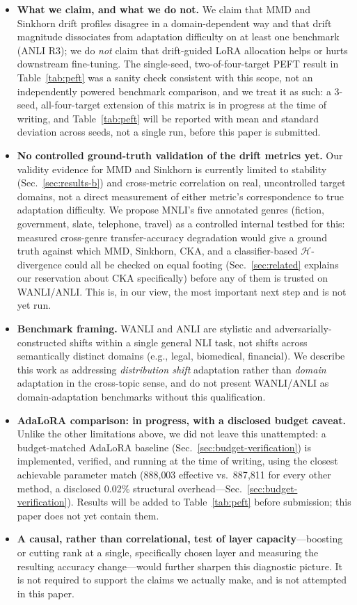 \documentclass[conference]{IEEEtran}
\begin{document}
\begin{itemize}
\item \textbf{What we claim, and what we do not.} We claim that MMD and Sinkhorn drift profiles disagree in a domain-dependent way and that drift magnitude dissociates from adaptation difficulty on at least one benchmark (ANLI R3); we do \emph{not} claim that drift-guided LoRA allocation helps or hurts downstream fine-tuning. The single-seed, two-of-four-target PEFT result in Table~\ref{tab:peft} was a sanity check consistent with this scope, not an independently powered benchmark comparison, and we treat it as such: a 3-seed, all-four-target extension of this matrix is in progress at the time of writing, and Table~\ref{tab:peft} will be reported with mean and standard deviation across seeds, not a single run, before this paper is submitted.
\item \textbf{No controlled ground-truth validation of the drift metrics yet.} Our validity evidence for MMD and Sinkhorn is currently limited to stability (Sec.~\ref{sec:results-b}) and cross-metric correlation on real, uncontrolled target domains, not a direct measurement of either metric's correspondence to true adaptation difficulty. We propose MNLI's five annotated genres (fiction, government, slate, telephone, travel) as a controlled internal testbed for this: measured cross-genre transfer-accuracy degradation would give a ground truth against which MMD, Sinkhorn, CKA, and a classifier-based $\mathcal{H}$-divergence \cite{bendavid2010theory} could all be checked on equal footing (Sec.~\ref{sec:related} explains our reservation about CKA specifically) before any of them is trusted on WANLI/ANLI. This is, in our view, the most important next step and is not yet run.
\item \textbf{Benchmark framing.} WANLI and ANLI are stylistic and adversarially-constructed shifts within a single general NLI task, not shifts across semantically distinct domains (e.g., legal, biomedical, financial). We describe this work as addressing \emph{distribution shift} adaptation rather than \emph{domain} adaptation in the cross-topic sense, and do not present WANLI/ANLI as domain-adaptation benchmarks without this qualification.
\item \textbf{AdaLoRA comparison: in progress, with a disclosed budget caveat.} Unlike the other limitations above, we did not leave this unattempted: a budget-matched AdaLoRA baseline (Sec.~\ref{sec:budget-verification}) is implemented, verified, and running at the time of writing, using the closest achievable parameter match (888{,}003 effective vs.\ 887{,}811 for every other method, a disclosed 0.02\% structural overhead---Sec.~\ref{sec:budget-verification}). Results will be added to Table~\ref{tab:peft} before submission; this paper does not yet contain them.
\item \textbf{A causal, rather than correlational, test of layer capacity}---boosting or cutting rank at a single, specifically chosen layer and measuring the resulting accuracy change---would further sharpen this diagnostic picture. It is not required to support the claims we actually make, and is not attempted in this paper.
\end{itemize}
\end{document}
